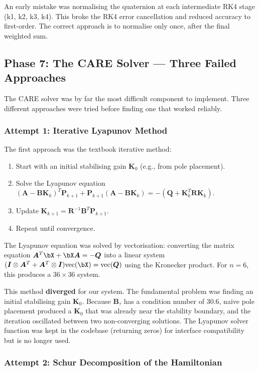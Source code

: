 \documentclass[12pt, a4paper]{article}
\newcommand{\bK}{\bm{K}}
\newcommand{\bA}{\bm{A}}
\newcommand{\bB}{\bm{B}}
\newcommand{\bP}{\bm{P}}
\newcommand{\bQ}{\bm{Q}}
\newcommand{\bR}{\bm{R}}
\newcommand{\bI}{\bm{I}}
\begin{document}
An early mistake was normalising the quaternion at each intermediate RK4 stage (k1, k2, k3, k4).  This broke the RK4 error cancellation and reduced accuracy to first-order.  The correct approach is to normalise only once, after the final weighted sum.

\subsection{Phase 7: The CARE Solver --- Three Failed Approaches}

The CARE solver was by far the most difficult component to implement.  Three different approaches were tried before finding one that worked reliably.

\subsubsection{Attempt 1: Iterative Lyapunov Method}

The first approach was the textbook iterative method:
\begin{enumerate}
    \item Start with an initial stabilising gain $\bK_0$ (e.g., from pole placement).
    \item Solve the Lyapunov equation $(\bA - \bB\bK_k)^T \bP_{k+1} + \bP_{k+1}(\bA - \bB\bK_k) = -(\bQ + \bK_k^T \bR \bK_k)$.
    \item Update $\bK_{k+1} = \bR^{-1} \bB^T \bP_{k+1}$.
    \item Repeat until convergence.
\end{enumerate}

The Lyapunov equation was solved by vectorisation: converting the matrix equation $\bA^T \bX + \bX \bA = -\bQ$ into a linear system $(\bI \otimes \bA^T + \bA^T \otimes \bI) \text{vec}(\bX) = \text{vec}(\bQ)$ using the Kronecker product.  For $n = 6$, this produces a $36 \times 36$ system.

This method \textbf{diverged} for our system.  The fundamental problem was finding an initial stabilising gain $\bK_0$.  Because $\bB_\tau$ has a condition number of 30.6, naive pole placement produced a $\bK_0$ that was already near the stability boundary, and the iteration oscillated between two non-converging solutions.  The Lyapunov solver function was kept in the codebase (returning zeros) for interface compatibility but is no longer used.

\subsubsection{Attempt 2: Schur Decomposition of the Hamiltonian}
\end{document}
